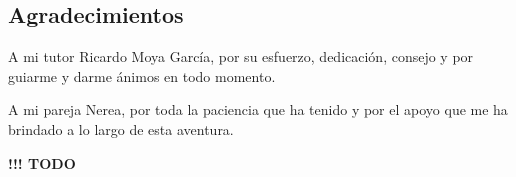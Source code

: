 \begin{flushright}
	\section*{Agradecimientos}
	 A mi tutor Ricardo Moya García, por su esfuerzo, dedicación, consejo y por guiarme y darme ánimos en todo momento.
	 
	 A mi pareja Nerea, por toda la paciencia que ha tenido y por el apoyo que me ha brindado a lo largo de esta aventura.
	 
	{\color{red} \textbf{!!! TODO}}
\end{flushright}